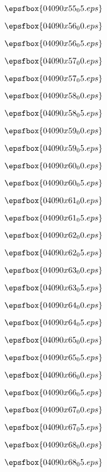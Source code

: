 \vfil \eject
$$\epsfbox{04090x55_05.eps}$$ 

\vfil \eject
$$\epsfbox{04090x56_00.eps}$$ 

\vfil \eject
$$\epsfbox{04090x56_05.eps}$$ 

\vfil \eject
$$\epsfbox{04090x57_00.eps}$$ 

\vfil \eject
$$\epsfbox{04090x57_05.eps}$$ 

\vfil \eject
$$\epsfbox{04090x58_00.eps}$$ 

\vfil \eject
$$\epsfbox{04090x58_05.eps}$$ 

\vfil \eject
$$\epsfbox{04090x59_00.eps}$$ 

\vfil \eject
$$\epsfbox{04090x59_05.eps}$$ 

\vfil \eject
$$\epsfbox{04090x60_00.eps}$$ 

\vfil \eject
$$\epsfbox{04090x60_05.eps}$$ 

\vfil \eject
$$\epsfbox{04090x61_00.eps}$$ 

\vfil \eject
$$\epsfbox{04090x61_05.eps}$$ 

\vfil \eject
$$\epsfbox{04090x62_00.eps}$$ 

\vfil \eject
$$\epsfbox{04090x62_05.eps}$$ 

\vfil \eject
$$\epsfbox{04090x63_00.eps}$$ 

\vfil \eject
$$\epsfbox{04090x63_05.eps}$$ 

\vfil \eject
$$\epsfbox{04090x64_00.eps}$$ 

\vfil \eject
$$\epsfbox{04090x64_05.eps}$$ 

\vfil \eject
$$\epsfbox{04090x65_00.eps}$$ 

\vfil \eject
$$\epsfbox{04090x65_05.eps}$$ 

\vfil \eject
$$\epsfbox{04090x66_00.eps}$$ 

\vfil \eject
$$\epsfbox{04090x66_05.eps}$$ 

\vfil \eject
$$\epsfbox{04090x67_00.eps}$$ 

\vfil \eject
$$\epsfbox{04090x67_05.eps}$$ 

\vfil \eject
$$\epsfbox{04090x68_00.eps}$$ 

\vfil \eject
$$\epsfbox{04090x68_05.eps}$$ 




\vfil \eject







